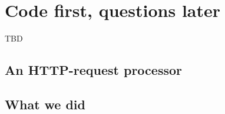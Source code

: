 \section{Code first, questions later}

TBD

\subsection{An HTTP-request processor}

\subsection{What we did}